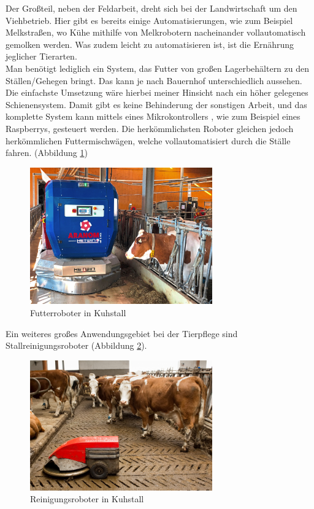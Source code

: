 Der Großteil, neben der Feldarbeit, dreht sich bei der Landwirtschaft um den
Viehbetrieb. Hier gibt es bereits einige Automatisierungen, wie zum Beispiel
Melkstraßen, wo Kühe mithilfe von Melkrobotern nacheinander vollautomatisch
gemolken werden. Was zudem leicht zu automatisieren ist, ist die Ernährung
jeglicher Tierarten.\\ Man benötigt lediglich ein System, das Futter von großen
Lagerbehältern zu den Ställen/Gehegen bringt. Das kann je nach Bauernhof
unterschiedlich aussehen. Die einfachste Umsetzung wäre hierbei meiner Hinsicht
nach ein höher gelegenes Schienensystem. Damit gibt es keine Behinderung der
sonstigen Arbeit, und das komplette System kann mittels eines
Mikrokontrollers , wie zum Beispiel eines Raspberrys, gesteuert werden. Die
herkömmlichsten Roboter gleichen jedoch herkömmlichen Futtermischwägen, welche
vollautomatisiert durch die Ställe fahren. (Abbildung \ref{fig:futterroboter})

\begin{figure}[ht]
    \centering
    \includegraphics[width=0.7\textwidth]{bilder/futterroboter.jpg}
    \caption[Futterroboter in Kuhstall]{Futterroboter in Kuhstall \cite{Futterroboter}}
    \label{fig:futterroboter}
\end{figure}

Ein weiteres großes Anwendungsgebiet bei der Tierpflege sind
Stallreinigungsroboter (Abbildung \ref{fig:rroboter}).

\begin{figure}[ht]
    \centering
    \includegraphics[width=0.7\textwidth]{bilder/Spaltenroboter_agrarfoto.com_.jpg}
    \caption[Reinigungsroboter in Kuhstall]{Reinigungsroboter in Kuhstall \cite{Reinigungsroboter}}
    \label{fig:rroboter}
\end{figure}


